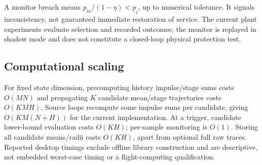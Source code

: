 A monitor breach means $p_m/(1-\eta)<\underline p_i$, up to numerical tolerance. It signals inconsistency, not guaranteed immediate restoration of service. The current plant experiments evaluate selection and recorded outcomes; the monitor is replayed in shadow mode and does not constitute a closed-loop physical protection test.

\subsection{Computational scaling}
For fixed state dimension, precomputing history impulse/stage sums costs $O(MN)$ and propagating $K$ candidate mean/stage trajectories costs $O(KMH)$. Source loops recompute some impulse sums per candidate, giving $O(KM(N+H))$ for the current implementation. At a trigger, candidate lower-bound evaluation costs $O(KH)$; per-sample monitoring is $O(1)$. Storing all candidate means/radii costs $O(KH)$, apart from optional full raw traces. Reported desktop timings exclude offline library construction and are descriptive, not embedded worst-case timing or a flight-computing qualification.
